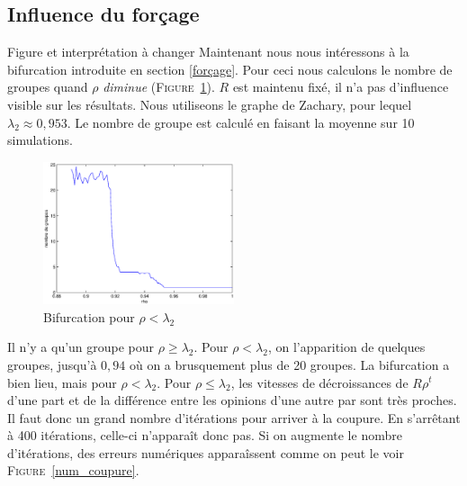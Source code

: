 \documentclass[12pt]{article}
\newcommand{\fig}[1]{\textsc{Figure}~\ref{#1}}
\begin{document}


\subsection{Influence du forçage}
Figure et interprétation à changer
Maintenant nous nous intéressons à la bifurcation introduite en section \ref{forçage}.
Pour ceci nous calculons le nombre de groupes quand $\rho$ \emph{diminue}
(\fig{bifu_map}). $R$ est maintenu fixé, il n'a pas d'influence visible sur les résultats.
Nous utiliseons le graphe de Zachary, pour lequel $\lambda_2 \approx 0,953$.
Le nombre de groupe est calculé en faisant la moyenne sur 10 simulations.

\begin{figure}[htb]
	\begin{center}
		\includegraphics[width=0.5\textwidth]{bifur}
		\caption{Bifurcation pour $\rho < \lambda_2$}
		\label{bifu_map}
	\end{center}
\end{figure}

Il n'y a qu'un groupe pour $\rho \geq \lambda_2$. Pour $\rho < \lambda_2$, on l'apparition de quelques groupes, jusqu'à $0,94$ où
on a brusquement plus de 20 groupes. La bifurcation a bien lieu, mais pour $\rho < \lambda_2$. Pour $\rho \leq \lambda_2$, les
vitesses de décroissances de $R\rho^t$ d'une part et de la différence entre les opinions d'une autre par sont très proches. Il
faut donc un grand nombre d'itérations pour arriver à la coupure. En s'arrêtant à 400 itérations, celle-ci n'apparaît donc pas.
Si on augmente le nombre d'itérations, des erreurs numériques apparaîssent comme on peut le voir \fig{num_coupure}.
\end{document}
